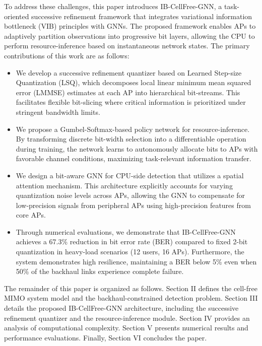 To address these challenges, this paper introduces IB-CellFree-GNN, a task-oriented successive refinement framework that integrates variational information bottleneck (VIB) principles with GNNs. The proposed framework enables APs to adaptively partition observations into progressive bit layers, allowing the CPU to perform resource-inference based on instantaneous network states. The primary contributions of this work are as follows:
\begin{itemize}
    \item We develop a successive refinement quantizer based on Learned Step-size Quantization (LSQ), which decomposes local linear minimum mean squared error (LMMSE) estimates at each AP into hierarchical bit-streams. This facilitates flexible bit-slicing where critical information is prioritized under stringent bandwidth limits.
    \item We propose a Gumbel-Softmax-based policy network for resource-inference. By transforming discrete bit-width selection into a differentiable operation during training, the network learns to autonomously allocate bits to APs with favorable channel conditions, maximizing task-relevant information transfer.
    \item We design a bit-aware GNN for CPU-side detection that utilizes a spatial attention mechanism. This architecture explicitly accounts for varying quantization noise levels across APs, allowing the GNN to compensate for low-precision signals from peripheral APs using high-precision features from core APs.
    \item Through numerical evaluations, we demonstrate that IB-CellFree-GNN achieves a 67.3\% reduction in bit error rate (BER) compared to fixed 2-bit quantization in heavy-load scenarios (12 users, 16 APs). Furthermore, the system demonstrates high resilience, maintaining a BER below 5\% even when 50\% of the backhaul links experience complete failure.
\end{itemize}

The remainder of this paper is organized as follows. Section II defines the cell-free MIMO system model and the backhaul-constrained detection problem. Section III details the proposed IB-CellFree-GNN architecture, including the successive refinement quantizer and the resource-inference module. Section IV provides an analysis of computational complexity. Section V presents numerical results and performance evaluations. Finally, Section VI concludes the paper.